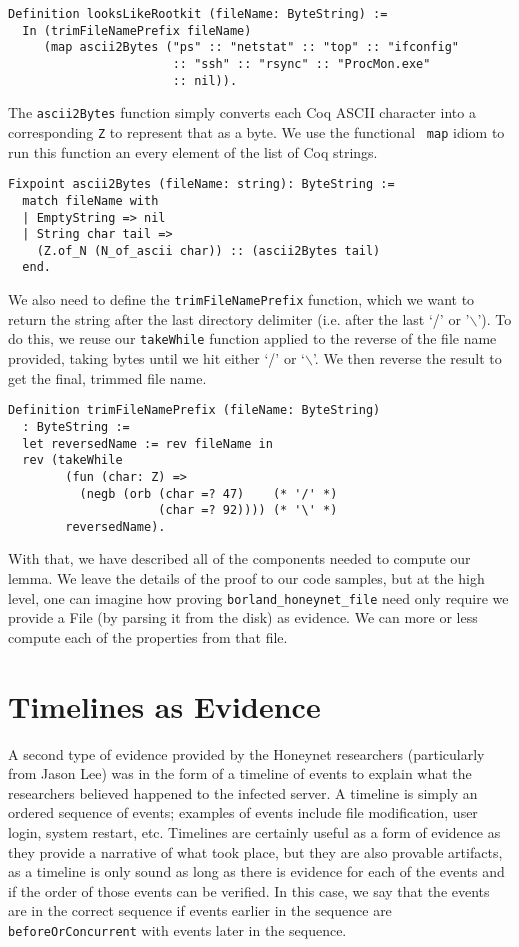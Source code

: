 \documentclass[nocopyrightspace]{sigplanconf}
\begin{document}
\begin{lstlisting}
Definition looksLikeRootkit (fileName: ByteString) :=
  In (trimFileNamePrefix fileName)
     (map ascii2Bytes ("ps" :: "netstat" :: "top" :: "ifconfig" 
                       :: "ssh" :: "rsync" :: "ProcMon.exe"
                       :: nil)).
\end{lstlisting}

The {\tt ascii2Bytes} function simply converts each Coq ASCII character into a
corresponding {\tt Z} to represent that as a byte. We use the functional {\tt
map} idiom to run this function an every element of the list of Coq strings.

\begin{lstlisting}
Fixpoint ascii2Bytes (fileName: string): ByteString :=
  match fileName with
  | EmptyString => nil
  | String char tail => 
    (Z.of_N (N_of_ascii char)) :: (ascii2Bytes tail)
  end.
\end{lstlisting}

We also need to define the {\tt trimFileNamePrefix} function, which we want to
return the string after the last directory delimiter (i.e. after the last `/'
or '$\backslash$'). To do this, we reuse our {\tt takeWhile} function applied
to the reverse of the file name provided, taking bytes until we hit either `/'
or `$\backslash$'. We then reverse the result to get the final, trimmed file
name.

\begin{lstlisting}
Definition trimFileNamePrefix (fileName: ByteString)
  : ByteString :=
  let reversedName := rev fileName in
  rev (takeWhile 
        (fun (char: Z) => 
          (negb (orb (char =? 47)    (* '/' *)
                     (char =? 92)))) (* '\' *)
        reversedName).
\end{lstlisting}

With that, we have described all of the components needed to compute our
lemma. We leave the details of the proof to our code samples, but at the high
level, one can imagine how proving {\tt borland\_honeynet\_file} need only
require we provide a File (by parsing it from the disk) as evidence. We can
more or less compute each of the properties from that file.

\section{Timelines as Evidence}

A second type of evidence provided by the Honeynet researchers (particularly
from Jason Lee\cite{lee}) was in the form of a timeline of events to explain
what the researchers believed happened to the infected server. A timeline is
simply an ordered sequence of events; examples of events include file
modification, user login, system restart, etc. Timelines are certainly useful
as a form of evidence as they provide a narrative of what took place, but they
are also provable artifacts, as a timeline is only sound as long as there is
evidence for each of the events and if the order of those events can be
verified. In this case, we say that the events are in the correct sequence if
events earlier in the sequence are {\tt beforeOrConcurrent} with events later
in the sequence.
\end{document}
